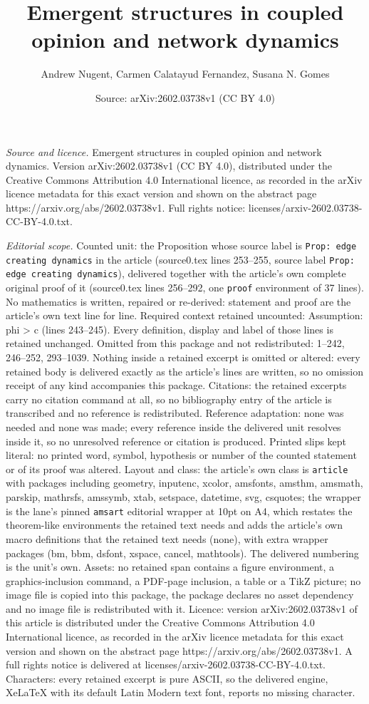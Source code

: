 \documentclass[10pt,a4paper]{amsart}
\title[Emergent structures in coupled opinion and network dynamics]{Emergent structures in coupled opinion and network dynamics}
\author{Andrew Nugent, Carmen Calatayud Fernandez, Susana N. Gomes}
\date{Source: arXiv:2602.03738v1 (CC BY 4.0)}
\begin{document}
\maketitle

\noindent\emph{Source and licence.} Emergent structures in coupled opinion and network dynamics. Version arXiv:2602.03738v1 (CC BY 4.0), distributed under the Creative Commons Attribution 4.0 International licence, as recorded in the arXiv licence metadata for this exact version and shown on the abstract page https://arxiv.org/abs/2602.03738v1. Full rights notice: licenses/arxiv-2602.03738-CC-BY-4.0.txt.\par\smallskip

\noindent\textit{Editorial scope.} Counted unit: the Proposition whose source label is \texttt{Prop: edge creating dynamics} in the article (source0.tex lines 253--255, source label \texttt{Prop: edge creating dynamics}), delivered together with the article's own complete original proof of it (source0.tex lines 256--292, one \texttt{proof} environment of 37 lines). No mathematics is written, repaired or re-derived: statement and proof are the article's own text line for line. Required context retained uncounted: Assumption: phi > c (lines 243--245). Every definition, display and label of those lines is retained unchanged. Omitted from this package and not redistributed: 1--242, 246--252, 293--1039. Nothing inside a retained excerpt is omitted or altered: every retained body is delivered exactly as the article's lines are written, so no omission receipt of any kind accompanies this package. Citations: the retained excerpts carry no citation command at all, so no bibliography entry of the article is transcribed and no reference is redistributed. Reference adaptation: none was needed and none was made; every reference inside the delivered unit resolves inside it, so no unresolved reference or citation is produced. Printed slips kept literal: no printed word, symbol, hypothesis or number of the counted statement or of its proof was altered. Layout and class: the article's own class is \texttt{article} with packages including geometry, inputenc, xcolor, amsfonts, amsthm, amsmath, parskip, mathrsfs, amssymb, xtab, setspace, datetime, svg, csquotes; the wrapper is the lane's pinned \texttt{amsart} editorial wrapper at 10pt on A4, which restates the theorem-like environments the retained text needs and adds the article's own macro definitions that the retained text needs (none), with extra wrapper packages (bm, bbm, dsfont, xspace, cancel, mathtools). The delivered numbering is the unit's own. Assets: no retained span contains a figure environment, a graphics-inclusion command, a PDF-page inclusion, a table or a TikZ picture; no image file is copied into this package, the package declares no asset dependency and no image file is redistributed with it. Licence: version arXiv:2602.03738v1 of this article is distributed under the Creative Commons Attribution 4.0 International licence, as recorded in the arXiv licence metadata for this exact version and shown on the abstract page https://arxiv.org/abs/2602.03738v1. A full rights notice is delivered at licenses/arxiv-2602.03738-CC-BY-4.0.txt. Characters: every retained excerpt is pure ASCII, so the delivered engine, XeLaTeX with its default Latin Modern text font, reports no missing character.
\end{document}
